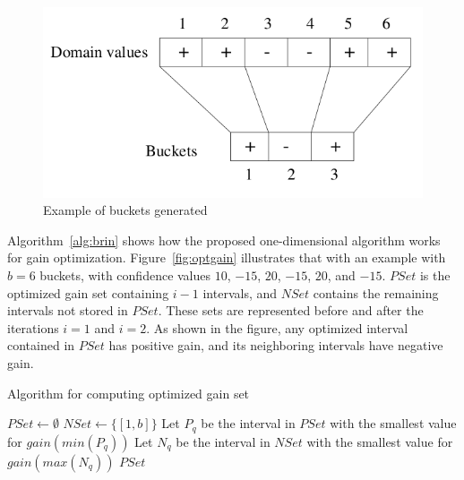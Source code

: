 \begin{figure}
\label{fig:brinbucket}
\begin{center}
  \includegraphics[width=0.5\linewidth]{./Figures/brin-bucket.png}
\end{center}
\caption{Example of buckets generated~\cite{Brin99miningoptimized}}
\end{figure}

Algorithm~\ref{alg:brin} shows how the proposed one-dimensional algorithm works for gain optimization.
Figure~\ref{fig:optgain} illustrates that with an example with $b=6$ buckets, with confidence values $10$, $-15$, $20$,
$-15$, $20$, and $-15$. $PSet$ is the optimized gain set containing $i-1$ intervals, and $NSet$ contains the
remaining intervals not stored in $PSet$. These sets are represented before and after the iterations $i=1$ and $i=2$.
As shown in the figure, any optimized interval contained in $PSet$ has positive gain, and its neighboring intervals
have negative gain.

\begin{algorithm}[h!]
 \caption{Algorithm for computing optimized gain set~\cite{Brin99miningoptimized}}
 \label{alg:brin}
  $PSet \leftarrow \emptyset$\;
  $NSet \leftarrow \{[1,b]\}$\;
   {
      Let $P_q$ be the interval in $PSet$ with the smallest value for $gain(min(P_q))$\;
      Let $N_q$ be the interval in $NSet$ with the smallest value for $gain(max(N_q))$\;
  }
  \Return $PSet$\;
\end{algorithm}

